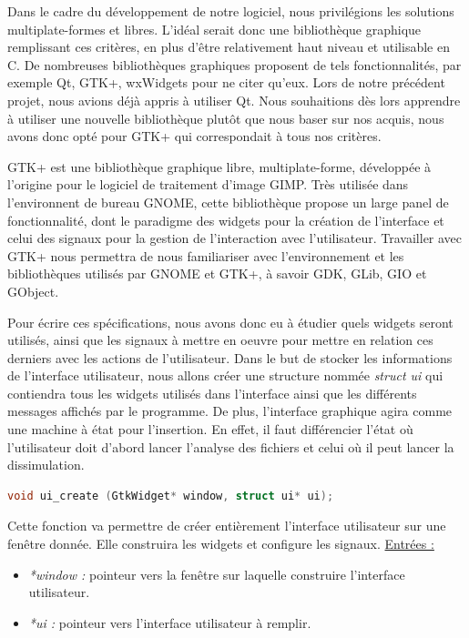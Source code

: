 \documentclass[11pt]{article}
\begin{document}
Dans le cadre du développement de notre logiciel, nous privilégions les
solutions multiplate-formes et libres. L'idéal serait donc une bibliothèque
graphique remplissant ces critères, en plus d'être relativement haut niveau et
utilisable en C. De nombreuses bibliothèques graphiques proposent de tels
fonctionnalités, par exemple Qt, GTK+, wxWidgets pour ne citer qu'eux. Lors de
notre précédent projet, nous avions déjà appris à utiliser Qt. Nous souhaitions
dès lors apprendre à utiliser une nouvelle bibliothèque plutôt que nous baser
sur nos acquis, nous avons donc opté pour GTK+ qui correspondait à tous nos
critères.

GTK+ est une bibliothèque graphique libre, multiplate-forme, développée à
l'origine pour le logiciel de traitement d'image GIMP. Très utilisée dans
l'environnent de bureau GNOME, cette bibliothèque propose un large panel de
fonctionnalité, dont le paradigme des widgets pour la création de l'interface et
celui des signaux pour la gestion de l'interaction avec l'utilisateur.
Travailler avec GTK+ nous permettra de nous familiariser avec l'environnement et
les bibliothèques utilisés par GNOME et GTK+, à savoir GDK, GLib, GIO et
GObject.

Pour écrire ces spécifications, nous avons donc eu à étudier quels widgets
seront utilisés, ainsi que les signaux à mettre en oeuvre pour mettre en
relation ces derniers avec les actions de l'utilisateur. Dans le but de stocker
les informations de l'interface utilisateur, nous allons créer une structure
nommée \textit{struct ui} qui contiendra tous les widgets utilisés dans
l'interface ainsi que les différents messages affichés par le programme. De
plus, l’interface graphique agira comme une machine à état pour l’insertion. En
effet, il faut différencier l'état où l’utilisateur doit d’abord lancer
l’analyse des fichiers et celui où il peut lancer la dissimulation.

\begin{lstlisting}[language=c]
void ui_create (GtkWidget* window, struct ui* ui);
\end{lstlisting}

Cette fonction va permettre de créer entièrement l'interface utilisateur 
sur une fenêtre donnée. Elle construira les widgets et configure les signaux. 
\newline
\underline{Entrées :} 
\begin{itemize}
\item \textit{*window :} pointeur vers la fenêtre sur laquelle construire 
l'interface utilisateur. 
\item \textit{*ui :} pointeur vers l'interface utilisateur à remplir. 
\newline 
\end{itemize}
\end{document}
